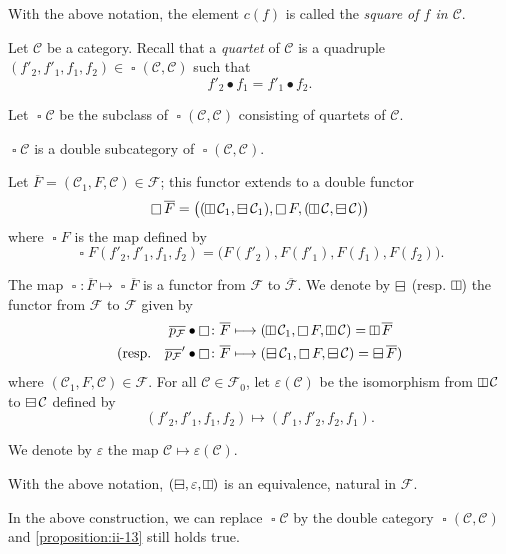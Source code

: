 \documentclass[a4paper,fleqn]{article}
\theoremstyle{plain}
\newenvironment{proposition}[1]
  {\renewcommand\theinnerproposition{#1}\innerproposition}
  {\endinnerproposition}
\theoremstyle{definition}
\newenvironment{definition}[1]
  {\renewcommand\theinnerdefinition{#1}\innerdefinition}
  {\endinnerdefinition}
\newcommand{\oldpage}[1]{{\marginpar{\footnotesize$\bigg\vert$\,\,\,\,\textit{p.~#1}}}}
\newcommand{\CC}{\mathcal{C}}
\newcommand{\FF}{\mathcal{F}}
\newcommand{\hsqbox}{{\boxminus}}
\newcommand{\vsqbox}{{\rotatebox{90}{$\boxminus$}}}
\DeclareMathOperator{\sq}{\square}
\DeclareMathOperator{\hsq}{\raisebox{-.05em}{$\hsqbox$}}
\DeclareMathOperator{\vsq}{\raisebox{-.1em}{$\vsqbox$}}
\begin{document}
\begin{definition}{14}
\label{definition:ii-14}
  With the above notation, the element $c(f)$ is called the \emph{square of $f$ in $\CC$}.
\end{definition}

Let $\CC$ be a category.
Recall \cite{3a} that a \emph{quartet} of $\CC$ is a quadruple $(f'_2,f'_1,f_1,f_2)\in\sq(\CC,\CC)$ such that
\[
  f'_2\bullet f_1
  = f'_1\bullet f_2.
\]

Let $\sq\CC$ be the subclass of $\sq(\CC,\CC)$ consisting of quartets of $\CC$.

\begin{proposition}{12}
\label{proposition:ii-12}
  $\sq\CC$ is a double subcategory of $\sq(\CC,\CC)$.
\end{proposition}

Let $\overline{F}=(\CC_1,F,\CC)\in\FF$;
this functor extends to a double functor
\[
  \sq\overline{F}
  = \big(
    (\vsq\CC_1,\hsq\CC_1), \sq F, (\vsq\CC,\hsq\CC)
  \big)
\]
where $\sq F$ is the map defined by
\[
  \sq F(f'_2,f'_1,f_1,f_2)
  = \big(
    F(f'_2), F(f'_1), F(f_1), F(f_2)
  \big).
\]

\oldpage{395}
The map $\sq\colon\overline{F}\mapsto\sq\overline{F}$ is a functor from $\FF$ to $\overline{\FF}$.
We denote by $\hsq$ (resp. $\vsq$) the functor from $\FF$ to $\FF$ given by
\[
  \begin{aligned}
    \overline{p_\FF}\bullet\sq
    &\colon \overline{F}
    \longmapsto (\vsq\CC_1,\sq F,\vsq\CC)
    = \vsq\overline{F}
  \\(\text{resp.}\quad \overline{p_\FF}'\bullet\sq
    &\colon \overline{F}
    \longmapsto (\hsq\CC_1,\sq F,\hsq\CC)
    = \hsq\overline{F})
  \end{aligned}
\]
where $(\CC_1,F,\CC)\in\FF$.
For all $\CC\in\FF_0$, let $\varepsilon(\CC)$ be the isomorphism from $\vsq\CC$ to $\hsq\CC$ defined by
\[
  (f'_2,f'_1,f_1,f_2)
  \longmapsto (f'_1,f'_2,f_2,f_1).
\]

We denote by $\varepsilon$ the map $\CC\mapsto\varepsilon(\CC)$.

\begin{proposition}{13}
\label{proposition:ii-13}
  With the above notation, $(\hsq,\varepsilon,\vsq)$ is an equivalence, natural in $\FF$.
\end{proposition}

In the above construction, we can replace $\sq\CC$ by the double category $\sq(\CC,\CC)$ and \cref{proposition:ii-13} still holds true.
\end{document}
